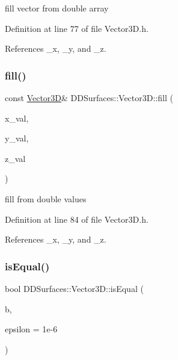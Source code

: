 fill vector from double array 



Definition at line 77 of file Vector3\+D.\+h.



References \+\_\+x, \+\_\+y, and \+\_\+z.

\hypertarget{class_d_d_surfaces_1_1_vector3_d_a6576119c90b9e05b6046506de6b1f87e}{}\label{class_d_d_surfaces_1_1_vector3_d_a6576119c90b9e05b6046506de6b1f87e} 
\subsubsection{\texorpdfstring{fill()}{fill()}\hspace{0.1cm}{\footnotesize\ttfamily [3/3]}}
{\footnotesize\ttfamily const \hyperlink{class_d_d_surfaces_1_1_vector3_d}{Vector3D}\& D\+D\+Surfaces\+::\+Vector3\+D\+::fill (\begin{DoxyParamCaption}\item[{double}]{x\+\_\+val,  }\item[{double}]{y\+\_\+val,  }\item[{double}]{z\+\_\+val }\end{DoxyParamCaption})\hspace{0.3cm}{\ttfamily [inline]}}



fill from double values 



Definition at line 84 of file Vector3\+D.\+h.



References \+\_\+x, \+\_\+y, and \+\_\+z.

\hypertarget{class_d_d_surfaces_1_1_vector3_d_af6ffa436fc2d34bb4485b5a4a18d008e}{}\label{class_d_d_surfaces_1_1_vector3_d_af6ffa436fc2d34bb4485b5a4a18d008e} 
\subsubsection{\texorpdfstring{is\+Equal()}{isEqual()}}
{\footnotesize\ttfamily bool D\+D\+Surfaces\+::\+Vector3\+D\+::is\+Equal (\begin{DoxyParamCaption}\item[{const \hyperlink{class_d_d_surfaces_1_1_vector3_d}{Vector3D} \&}]{b,  }\item[{double}]{epsilon = {\ttfamily 1e-\/6} }\end{DoxyParamCaption})\hspace{0.3cm}{\ttfamily [inline]}}

